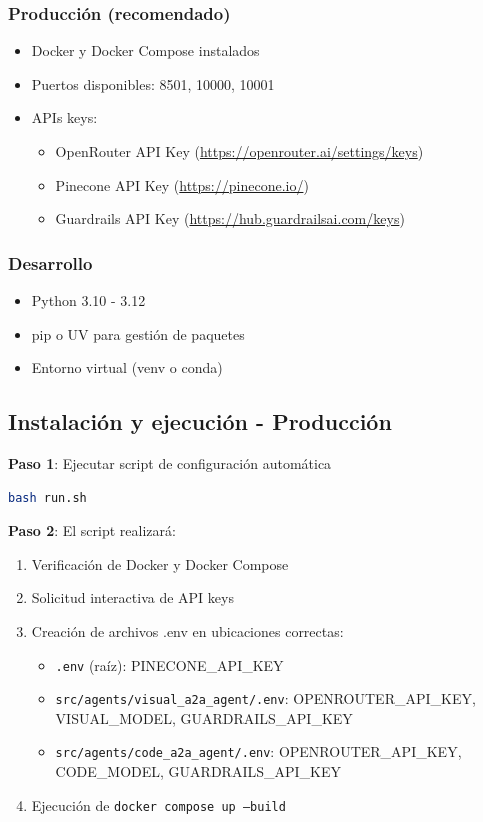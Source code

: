 \documentclass[12pt,a4paper]{article}
\begin{document}
\subsubsection{Producción (recomendado)}
\begin{itemize}
    \item Docker y Docker Compose instalados
    \item Puertos disponibles: 8501, 10000, 10001
    \item APIs keys:
    \begin{itemize}
        \item OpenRouter API Key (\url{https://openrouter.ai/settings/keys})
        \item Pinecone API Key (\url{https://pinecone.io/})
        \item Guardrails API Key (\url{https://hub.guardrailsai.com/keys})
    \end{itemize}
\end{itemize}

\subsubsection{Desarrollo}
\begin{itemize}
    \item Python 3.10 - 3.12
    \item pip o UV para gestión de paquetes
    \item Entorno virtual (venv o conda)
\end{itemize}

\subsection{Instalación y ejecución - Producción}

\textbf{Paso 1}: Ejecutar script de configuración automática

\begin{lstlisting}[language=bash]
bash run.sh
\end{lstlisting}

\textbf{Paso 2}: El script realizará:
\begin{enumerate}
    \item Verificación de Docker y Docker Compose
    \item Solicitud interactiva de API keys
    \item Creación de archivos .env en ubicaciones correctas:
    \begin{itemize}
        \item \texttt{.env} (raíz): PINECONE\_API\_KEY
        \item \texttt{src/agents/visual\_a2a\_agent/.env}: OPENROUTER\_API\_KEY, VISUAL\_MODEL, GUARDRAILS\_API\_KEY
        \item \texttt{src/agents/code\_a2a\_agent/.env}: OPENROUTER\_API\_KEY, CODE\_MODEL, GUARDRAILS\_API\_KEY
    \end{itemize}
    \item Ejecución de \texttt{docker compose up --build}
\end{enumerate}
\end{document}
